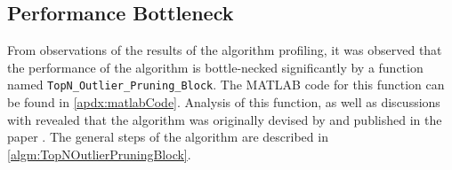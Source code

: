 \begin{comment}
\DTLrawmap{>}{$>$}
\DTLloadrawdb{initialProfilingDataH}{data/profiling/original-horizontal.csv}
\DTLloadrawdb{initialProfilingDataV}{data/profiling/original-vertical.csv}

\subsection{testCD}

\subsubsection{Results}
\begin{figure}[H]
	\centering
	\texttt{[image: profiling/original/testCD]}
\end{figure}
	
\begin{landscape}
	\subsubsection{Profile data}
	\begin{longtable}{|l|c|c|c|}
		\hline
		\bfseries Function Name & 
		\bfseries Calls & 
		\bfseries Total Time &
		\bfseries Self Time \endhead

		\DTLforeach*[\equal{\dataSet}{testCD.txt} \and \equal{\iteration}{average}]{initialProfilingDataV}{%
			\dataSet={Data set},\iteration=Iteration,\functionName={Function Name},\calls=Calls,\totalTime={Total Time},\selfTime={Self Time}}{%
			\functionName & \calls & \totalTime & \selfTime \\}
	\end{longtable}
\end{landscape}

\begin{comment}
\DTLpiechart[]{variable=\selfTime}{initialProfilingDataH}{\function=Function,\selfTime={testCD.txt}}

\begin{tabular}[b]{ll}
	\DTLforeach{fruit}{\name=Name}{\DTLiffirstrow{}{\\}%
		\DTLdocurrentpiesegmentcolor\rule{10pt}{10pt} & \name
}
\end{tabular}
\end{comment}

\subsection{Performance Bottleneck}
\label{sec:algorithmPerformanceBottleneck}
From observations of the results of the algorithm profiling, it was observed 
that the performance of the 
 algorithm is 
bottle-necked significantly by a function named 
\verb+TopN_Outlier_Pruning_Block+. The MATLAB code for this function can be 
found in \autoref{apdx:matlabCode}. Analysis of this function, as well as 
discussions with \citeauthor{Khoa:2012} revealed that the algorithm was 
originally devised by \citeauthor{Bay:2003} and published in the paper 
. The general steps of the algorithm are described in 
\autoref{algm:TopNOutlierPruningBlock}.

